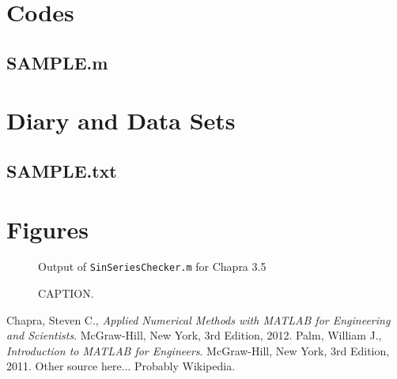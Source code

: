 \documentclass{article}
\begin{document}
\pagebreak
\appendix
\section{Codes}


\subsection{SAMPLE.m}
\clearpage %

\section{Diary and Data Sets}

\subsection{SAMPLE.txt}

\clearpage %

\section{Figures}

\begin{figure}[htb!]
\begin{center}
\caption{Output of {\tt SinSeriesChecker.m} for Chapra 3.5}
\end{center}
\end{figure}

\begin{figure}[ht!]
\begin{center}
\caption{CAPTION.}
\end{center}
\end{figure}

\clearpage %

\begin{thebibliography}{9}
  Chapra, Steven C.,
  {\it Applied Numerical Methods with MATLAB for Engineering and Scientists}.
  McGraw-Hill, New York,
  3rd Edition,
  2012.
  Palm, William J.,
  {\it Introduction to MATLAB for Engineers}.
  McGraw-Hill, New York,
  3rd Edition,
  2011.
  Other source here...  Probably Wikipedia.
\end{thebibliography}
\end{document}
